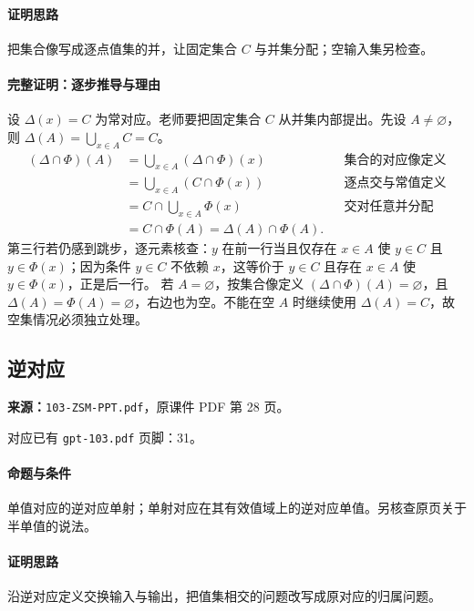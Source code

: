 \paragraph{证明思路}把集合像写成逐点值集的并，让固定集合 $C$ 与并集分配；空输入集另检查。
\paragraph{完整证明：逐步推导与理由}

设 $\Delta(x)=C$ 为常对应。老师要把固定集合 $C$ 从并集内部提出。先设 $A\ne\varnothing$，则 $\Delta(A)=\bigcup_{x\in A}C=C$。
\begin{align*}
(\Delta\cap\Phi)(A)
&=\bigcup_{x\in A}(\Delta\cap\Phi)(x)&&\text{集合的对应像定义}\\
&=\bigcup_{x\in A}(C\cap\Phi(x))&&\text{逐点交与常值定义}\\
&=C\cap\bigcup_{x\in A}\Phi(x)&&\text{交对任意并分配}\\
&=C\cap\Phi(A)=\Delta(A)\cap\Phi(A).
\end{align*}
第三行若仍感到跳步，逐元素核查：$y$ 在前一行当且仅存在 $x\in A$ 使 $y\in C$ 且 $y\in\Phi(x)$；因为条件 $y\in C$ 不依赖 $x$，这等价于 $y\in C$ 且存在 $x\in A$ 使 $y\in\Phi(x)$，正是后一行。
若 $A=\varnothing$，按集合像定义 $(\Delta\cap\Phi)(A)=\varnothing$，且 $\Delta(A)=\Phi(A)=\varnothing$，右边也为空。不能在空 $A$ 时继续使用 $\Delta(A)=C$，故空集情况必须独立处理。

\clearpage\subsection{逆对应}
\textbf{来源：}\texttt{103-ZSM-PPT.pdf}，原课件 PDF 第 28 页。\par
对应已有 \texttt{gpt-103.pdf} 页脚：31。\par
\paragraph{命题与条件}单值对应的逆对应单射；单射对应在其有效值域上的逆对应单值。另核查原页关于半单值的说法。
\paragraph{证明思路}沿逆对应定义交换输入与输出，把值集相交的问题改写成原对应的归属问题。
